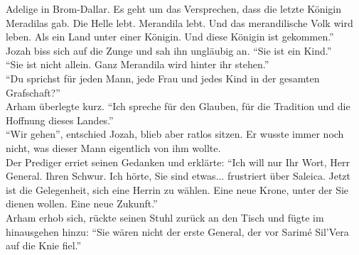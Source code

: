 Adelige in Brom-Dallar. Es geht um das Versprechen, dass die letzte Königin Meradilas gab. Die 
Helle lebt. Merandila lebt. Und das merandilische Volk wird leben. Als ein Land unter einer 
Königin. Und diese Königin ist gekommen.''\\
Jozah biss sich auf die Zunge und sah ihn ungläubig an. ``Sie ist ein Kind.''\\
``Sie ist nicht allein. Ganz Merandila wird hinter ihr stehen.''\\
``Du sprichst für jeden Mann, jede Frau und jedes Kind in der gesamten Grafschaft?''\\
Arham überlegte kurz. ``Ich spreche für den Glauben, für die Tradition und die Hoffnung dieses 
Landes.''\\
``Wir gehen'', entschied Jozah, blieb aber ratlos sitzen. Er wusste immer noch nicht, was dieser 
Mann eigentlich von ihm wollte.\\
Der Prediger erriet seinen Gedanken und erklärte: ``Ich will nur Ihr Wort, Herr General. Ihren 
Schwur. Ich hörte, Sie sind etwas... frustriert über Saleica. Jetzt ist die Gelegenheit, sich eine 
Herrin zu wählen. Eine neue Krone, unter der Sie dienen wollen. Eine neue Zukunft.''\\ Arham erhob 
sich, rückte seinen Stuhl zurück an den Tisch und fügte im hinausgehen hinzu: ``Sie wären nicht der 
erste General, der vor Sarimé Sil'Vera auf die Knie fiel.''\\